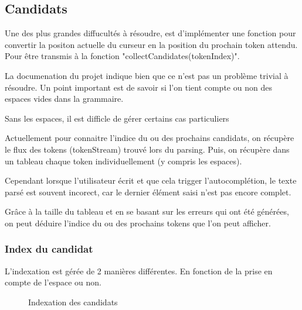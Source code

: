\documentclass[
    iict, %
    il, %
]{heig-tb}
\begin{document}

\subsection{Candidats}\label{candidates}

Une des plus grandes diffucultés à résoudre, est d'implémenter une fonction pour convertir la positon actuelle du curseur en la position du prochain token attendu.
Pour être transmis à la fonction "collectCandidates(tokenIndex)". %

La documenation du projet indique bien que ce n'est pas un problème trivial à résoudre.
Un point important est de savoir si l'on tient compte ou non des espaces vides dans la grammaire.

Sans les espaces, il est difficle de gérer certains cas particuliers %



Actuellement pour connaitre l'indice du ou des prochains candidats, on récupère le flux des tokens (tokenStream) trouvé lors du parsing.
Puis, on récupère dans un tableau chaque token individuellement (y compris les espaces).

Cependant lorsque l'utilisateur écrit et que cela trigger l'autocomplétion, le texte parsé est souvent incorect, car le dernier élément saisi n'est pas encore complet.

Grâce à la taille du tableau et en se basant sur les erreurs qui ont été générées, on peut déduire l'indice du ou des prochains tokens que l'on peut afficher.

\subsubsection{Index du candidat}
L'indexation est gérée de 2 manières différentes. En fonction de la prise en compte de l'espace ou non.

\begin{figure}[!h]
    \begin{center}
    \end{center}
    \caption[Indexation des candidats]{\label{candidat-index} Indexation des candidats}
\end{figure}
\end{document}
